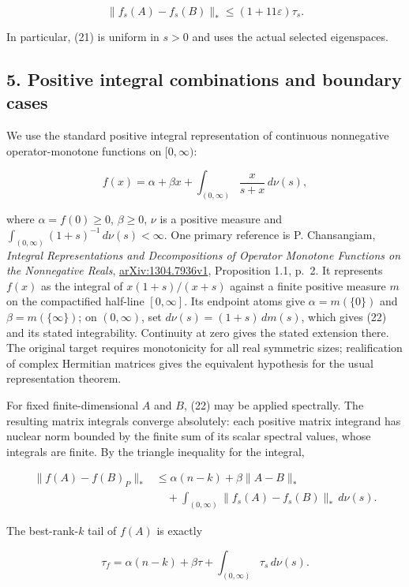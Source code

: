 \documentclass[10pt,a4paper]{article}
\begin{document}
\[
\|f_s(A)-f_s(B)\|_*\le(1+11\varepsilon)\tau_s.\tag{21}
\]

In particular, (21) is uniform in \(s>0\) and uses the actual selected
eigenspaces.

\subsection{5. Positive integral combinations and boundary
cases}\label{positive-integral-combinations-and-boundary-cases}

We use the standard positive integral representation of continuous
nonnegative operator-monotone functions on \([0,\infty)\):

\[
f(x)=\alpha+\beta x+\int_{(0,\infty)}\frac{x}{s+x}\,d\nu(s),\tag{22}
\]

where \(\alpha=f(0)\ge0\), \(\beta\ge0\), \(\nu\) is a positive measure
and \(\int_{(0,\infty)}(1+s)^{-1}\,d\nu(s)<\infty\). One primary
reference is P. Chansangiam, \emph{Integral Representations and
Decompositions of Operator Monotone Functions on the Nonnegative Reals},
\href{https://arxiv.org/pdf/1304.7936v1}{arXiv:1304.7936v1}, Proposition
1.1, p.~2. It represents \(f(x)\) as the integral of \(x(1+s)/(x+s)\)
against a finite positive measure \(m\) on the compactified half-line
\([0,\infty]\). Its endpoint atoms give \(\alpha=m(\{0\})\) and
\(\beta=m(\{\infty\})\); on \((0,\infty)\), set
\(d\nu(s)=(1+s)\,dm(s)\), which gives (22) and its stated integrability.
Continuity at zero gives the stated extension there. The original target
requires monotonicity for all real symmetric sizes; realification of
complex Hermitian matrices gives the equivalent hypothesis for the usual
representation theorem.

For fixed finite-dimensional \(A\) and \(B\), (22) may be applied
spectrally. The resulting matrix integrals converge absolutely: each
positive matrix integrand has nuclear norm bounded by the finite sum of
its scalar spectral values, whose integrals are finite. By the triangle
inequality for the integral,

\[
\begin{aligned}
\|f(A)-f(B)_P\|_*
&\le\alpha(n-k)+\beta\|A-B\|_*\\
&\quad+\int_{(0,\infty)}\|f_s(A)-f_s(B)\|_*\,d\nu(s).
\end{aligned}
\]

The best-rank-\(k\) tail of \(f(A)\) is exactly

\[
\tau_f=\alpha(n-k)+\beta\tau
       +\int_{(0,\infty)}\tau_s\,d\nu(s).
\]
\end{document}
